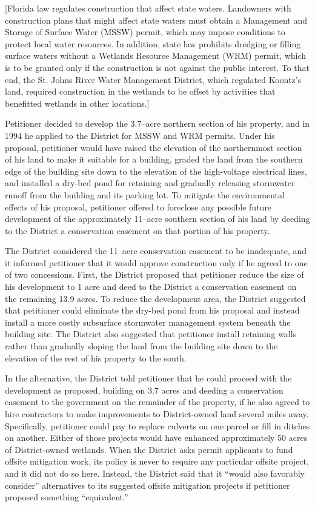 [Florida law regulates construction that affect state waters. Landowners with
construction plans that might affect state waters must obtain a Management and
Storage of Surface Water (MSSW) permit, which may impose conditions to protect
local water resources. In addition, state law prohibits dredging or filling
surface waters without a Wetlands Resource Management (WRM) permit, which is to
be granted only if the construction is not against the public interest. To that
end, the St. Johns River Water Management District, which regulated Koontz's
land, required construction in the wetlands to be offset by activities that
benefitted wetlands in other locations.]

Petitioner decided to develop the 3.7--acre northern section of his property,
and in 1994 he applied to the District for MSSW and WRM permits. Under his
proposal, petitioner would have raised the elevation of the northernmost section
of his land to make it suitable for a building, graded the land from the
southern edge of the building site down to the elevation of the high-voltage
electrical lines, and installed a dry-bed pond for retaining and gradually
releasing stormwater runoff from the building and its parking lot. To mitigate
the environmental effects of his proposal, petitioner offered to foreclose any
possible future development of the approximately 11--acre southern section of
his land by deeding to the District a conservation easement on that portion of
his property.

The District considered the 11--acre conservation easement to be inadequate, and
it informed petitioner that it would approve construction only if he agreed to
one of two concessions. First, the District proposed that petitioner reduce the
size of his development to 1 acre and deed to the District a conservation
easement on the remaining 13.9 acres. To reduce the development area, the
District suggested that petitioner could eliminate the dry-bed pond from his
proposal and instead install a more costly subsurface stormwater management
system beneath the building site. The District also suggested that petitioner
install retaining walls rather than gradually sloping the land from the building
site down to the elevation of the rest of his property to the south.

In the alternative, the District told petitioner that he could proceed with the
development as proposed, building on 3.7 acres and deeding a conservation
easement to the government on the remainder of the property, if he also agreed
to hire contractors to make improvements to District-owned land several miles
away. Specifically, petitioner could pay to replace culverts on one parcel or
fill in ditches on another. Either of those projects would have enhanced
approximately 50 acres of District-owned wetlands. When the District asks permit
applicants to fund offsite mitigation work, its policy is never to require any
particular offsite project, and it did not do so here. Instead, the District
said that it ``would also favorably consider'' alternatives to its suggested
offsite mitigation projects if petitioner proposed something ``equivalent.'' 

